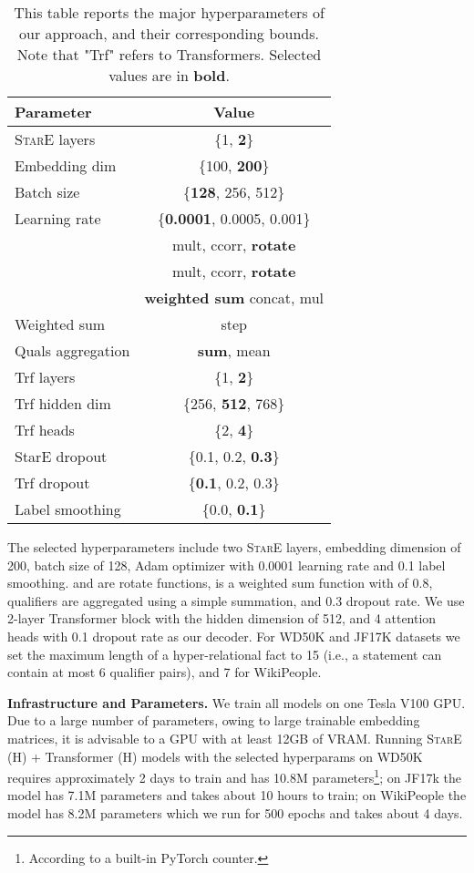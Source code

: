 \documentclass[11pt,a4paper]{article}
\begin{document}
\begin{table}[!h]
\centering
\caption{This table reports the major hyperparameters of our approach, and their corresponding bounds. Note that "Trf" refers to Transformers. Selected values are in \textbf{bold}.}
\label{tab:hyperparams_search}
\begin{tabular}{@{}lc@{}}
\toprule
Parameter & Value \\ \midrule
\textsc{StarE} layers & \{1, \textbf{2}\} \\
Embedding dim & \{100, \textbf{200}\} \\
Batch size & \{\textbf{128}, 256, 512\}  \\
Learning rate & \{\textbf{0.0001}, 0.0005, 0.001\} \\
 & mult, ccorr, \textbf{rotate} \\
 & mult, ccorr, \textbf{rotate} \\
 & \textbf{weighted sum} concat, mul \\
Weighted sum  &  step  \\
Quals aggregation & \textbf{sum}, mean \\  
Trf layers & \{1, \textbf{2}\} \\
Trf hidden dim & \{256, \textbf{512}, 768\} \\
Trf heads & \{2, \textbf{4}\} \\
StarE dropout & \{0.1, 0.2, \textbf{0.3}\}\\
Trf dropout & \{\textbf{0.1}, 0.2, 0.3\}\\
Label smoothing & \{0.0, \textbf{0.1}\} \\
\bottomrule
\end{tabular}
\end{table}

The selected hyperparameters include two \textsc{StarE} layers, embedding dimension of 200, batch size of 128, Adam optimizer with 0.0001 learning rate and 0.1 label smoothing.  and  are rotate functions,  is a weighted sum function with  of 0.8, qualifiers are aggregated using a simple summation, and 0.3 dropout rate. 
We use 2-layer Transformer block with the hidden dimension of 512, and 4 attention heads with 0.1 dropout rate as our decoder.
For WD50K and JF17K datasets we set the maximum length of a hyper-relational fact to 15 (i.e., a statement can contain at most 6 qualifier pairs), and 7 for WikiPeople.

\textbf{Infrastructure and Parameters.}
We train all models on one Tesla V100 GPU. 
Due to a large number of parameters, owing to large trainable embedding matrices, it is advisable to a GPU with at least 12GB of VRAM.
Running \textsc{StarE} (H) + Transformer (H) models with the selected hyperparams on WD50K requires approximately 2 days to train and has 10.8M parameters\footnote{According to a built-in PyTorch counter.}; on JF17k the model has 7.1M parameters and takes about 10 hours to train; on WikiPeople the model has 8.2M parameters which we run for 500 epochs and takes about 4 days. 
\end{document}
